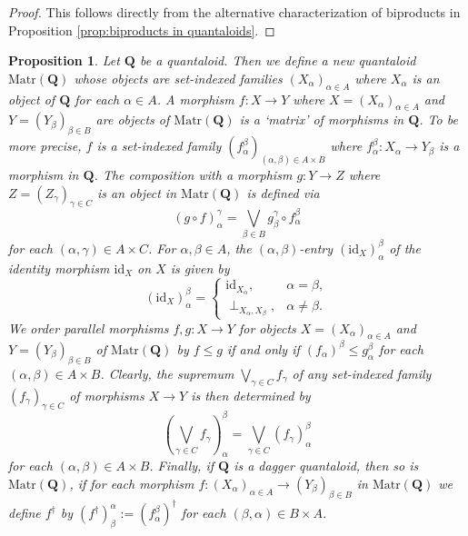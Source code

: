 \documentclass[12pt]{tac}
\newtheorem{proposition}[theorem]{Proposition}
\theoremstyle{definition}
\theoremstyle{remark}
\newcommand{\<}{\langle}
\renewcommand{\>}{\rangle}
\renewcommand{\:}{\colon}
\newcommand{\id}{\mathrm{id}}
\begin{document}
\begin{proof}
This follows directly from the alternative characterization of biproducts in Proposition \ref{prop:biproducts in quantaloids}.
\end{proof}


\begin{proposition}\cite[Example 3.7]{Heymans-Stubbe-2}
Let $\mathbf Q$ be a quantaloid. Then we define a new quantaloid $\mathrm{Matr}(\mathbf Q)$ whose objects are set-indexed families $(X_\alpha)_{\alpha\in A}$ where $X_\alpha$ is an object of $\mathbf Q$ for each $\alpha\in A$. A morphism $f:X\to Y$ where $X=(X_\alpha)_{\alpha\in A}$ and $Y=(Y_\beta)_{\beta\in B}$ are objects of $\mathrm{Matr}(\mathbf Q)$ is a `matrix' of morphisms in $\mathbf Q$. To be more precise, $f$ is a set-indexed family $(f_\alpha^\beta)_{(\alpha,\beta)\in A\times B}$ where $f_\alpha^\beta:X_\alpha\to Y_\beta$ is a morphism in $\mathbf Q$. The composition with a morphism $g:Y\to Z$ where $Z=(Z_\gamma)_{\gamma\in C}$ is an object in $\mathrm{Matr}(\mathbf Q)$ is defined via
\[ (g\circ f)_\alpha^\gamma=\bigvee_{\beta\in B}g_\beta^\gamma\circ f_\alpha^\beta\]
for each $(\alpha,\gamma)\in A\times C$. For $\alpha,\beta\in A$, the $(\alpha,\beta)$-entry $(\id_X)_\alpha^\beta$ of the identity morphism $\id_X$ on $X$ is given by
\[ (\id_X)_\alpha^{\beta}= \begin{cases}\id_{X_\alpha}, & \alpha=\beta,\\
\perp_{X_\alpha,X_{\beta}}, & \alpha\neq\beta.
\end{cases}\]
We order parallel morphisms $f,g:X\to Y$ for objects $X=(X_\alpha)_{\alpha\in A}$ and $Y=(Y_\beta)_{\beta\in B}$ of $\mathrm{Matr}(\mathbf Q)$ by $f\leq g$ if and only if $(f_\alpha)^\beta\leq g_\alpha^\beta$ for each $(\alpha,\beta)\in A\times B$. Clearly, the supremum $\bigvee_{\gamma\in C}f_\gamma$ of any set-indexed family $(f_\gamma)_{\gamma\in C}$ of morphisms $X\to Y$ is then determined by
\[ \left(\bigvee_{\gamma\in C}f_\gamma\right)_\alpha^\beta=\bigvee_{\gamma\in C}(f_\gamma)_\alpha^\beta\]
for each $(\alpha,\beta)\in A\times B$.
Finally, if $\mathbf Q$ is a dagger quantaloid, then so is $\mathrm{Matr}(\mathbf Q)$, if for each morphism $f:(X_\alpha)_{\alpha\in A}\to (Y_\beta)_{\beta\in B}$ in $\mathrm{Matr}(\mathbf Q)$ we define $f^\dag$ by $(f^\dag)_{\beta}^\alpha:=(f_\alpha^\beta)^\dag$ for each $(\beta,\alpha)\in B\times A$.
\end{proposition}
\end{document}
